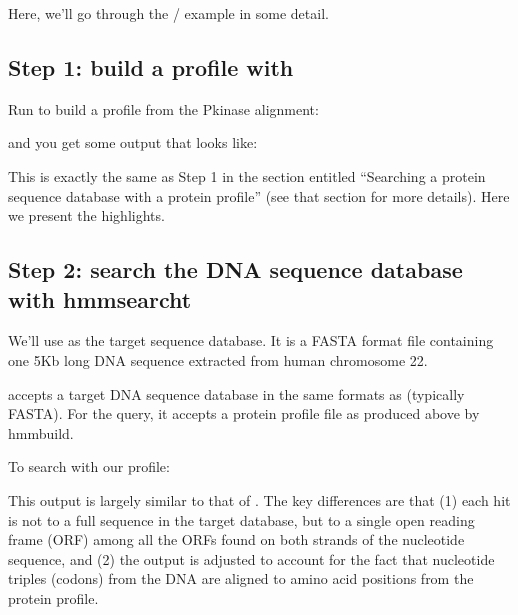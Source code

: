 Here, we'll go through the / example in
some detail.

\subsection{Step 1: build a profile with }

Run  to build a profile from the Pkinase
alignment:

   \vspace{1ex}
   \vspace{1ex}

and you get some output that looks like:


This is exactly the same as Step 1 in the section entitled 
``Searching a protein sequence database with a protein profile''
(see that section for more details). Here we present the highlights.


\subsection{Step 2: search the DNA sequence database with hmmsearcht}

We'll use  as the target sequence
database. It is a FASTA format file containing one 5Kb long DNA
sequence extracted from human chromosome 22.

 accepts a target DNA sequence database in the same
formats as  (typically FASTA). For the query, it accepts
a protein profile file as produced above by hmmbuild.

To search  with our  profile:

   \vspace{1ex}
   \vspace{1ex}

This output is largely similar to that of . The key
differences are that (1) each hit is not to a full sequence in the 
target database, but to a single open reading frame (ORF) among all 
the ORFs found on both strands of the nucleotide sequence, and 
(2) the output is adjusted to account for the fact that nucleotide
triples (codons) from the DNA are aligned to amino acid positions from the
protein profile.

